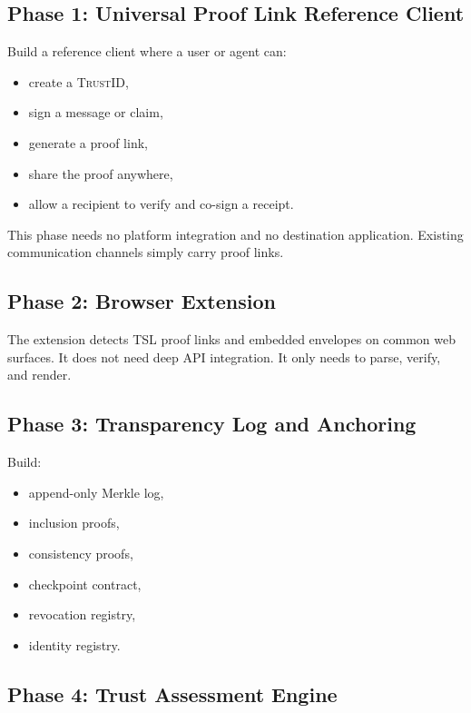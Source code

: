 \documentclass[11pt]{article}
\newcommand{\TSL}{\textsc{TSL}}
\newcommand{\TrustID}{\textsc{TrustID}}
\begin{document}
\subsection{Phase 1: Universal Proof Link Reference Client}

Build a reference client where a user or agent can:

\begin{itemize}
    \item create a \TrustID{},
    \item sign a message or claim,
    \item generate a proof link,
    \item share the proof anywhere,
    \item allow a recipient to verify and co-sign a receipt.
\end{itemize}

This phase needs no platform integration and no destination application. Existing communication channels simply carry proof links.

\subsection{Phase 2: Browser Extension}

The extension detects \TSL{} proof links and embedded envelopes on common web surfaces. It does not need deep API integration. It only needs to parse, verify, and render.

\subsection{Phase 3: Transparency Log and Anchoring}

Build:

\begin{itemize}
    \item append-only Merkle log,
    \item inclusion proofs,
    \item consistency proofs,
    \item checkpoint contract,
    \item revocation registry,
    \item identity registry.
\end{itemize}

\subsection{Phase 4: Trust Assessment Engine}
\end{document}
